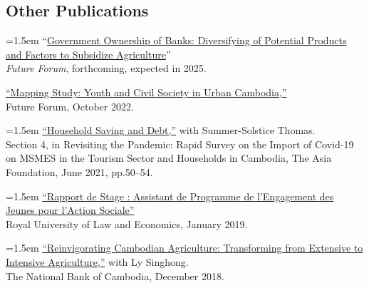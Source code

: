 \documentclass[10pt,a4paper]{article}
\begin{document}

\subsection*{Other Publications}

	\hangindent=1.5em
	“\href{https://kosalnith.github.io/research/papers/GOB.pdf}{Government Ownership of Banks: Diversifying of Potential Products and Factors to Subsidize Agriculture}” \\
	\textit{Future Forum}, forthcoming, expected in 2025. \\ \vspace{-.5em} 
	
	\href{}{``Mapping Study: Youth and Civil Society in Urban Cambodia,”} \\
	Future Forum, October 2022.\\ \vspace{-.5em} 
	
	\hangindent=1.5em
	\href{https://kosalnith.github.io/research/policies/COVID-19-HHSavingsDebt.pdf}{``Household Saving and Debt,”} with Summer-Solstice Thomas.\\
	Section 4, in Revisiting the Pandemic: Rapid Survey on the Import of Covid-19 on MSMES in the Tourism Sector and Households in Cambodia, The Asia Foundation, June 2021, pp.50--54.\\ \vspace{-.5em} 
			
	\hangindent=1.5em
	\href{https://www.researchgate.net/publication/330936932_Rapport_du_Stage_Assistant_de_Programme_a_l%27YRDP}{``Rapport de Stage : Assistant de Programme de l'Engagement des Jeunes pour l'Action Sociale”} \\
	Royal University of Law and Economics, January 2019. \\ \vspace{-.5em}
			
	\hangindent=1.5em
	\href{https://ideas.repec.org/p/pra/mprapa/93086.html}{``Reinvigorating Cambodian Agriculture: Transforming from Extensive to Intensive Agriculture,”} with Ly Singhong. \\
	The National Bank of Cambodia, December 2018. 
\end{document}
